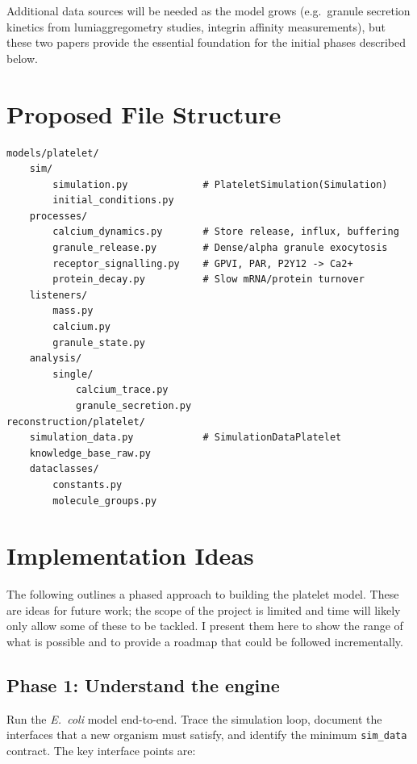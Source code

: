 \documentclass[11pt,a4paper]{article}
\begin{document}
Additional data sources will be needed as the model grows (e.g.\ granule
secretion kinetics from lumiaggregometry studies, integrin affinity
measurements), but these two papers provide the essential foundation for the
initial phases described below.


\section{Proposed File Structure}

\begin{Verbatim}[fontsize=\small]
models/platelet/
    sim/
        simulation.py             # PlateletSimulation(Simulation)
        initial_conditions.py
    processes/
        calcium_dynamics.py       # Store release, influx, buffering
        granule_release.py        # Dense/alpha granule exocytosis
        receptor_signalling.py    # GPVI, PAR, P2Y12 -> Ca2+
        protein_decay.py          # Slow mRNA/protein turnover
    listeners/
        mass.py
        calcium.py
        granule_state.py
    analysis/
        single/
            calcium_trace.py
            granule_secretion.py
reconstruction/platelet/
    simulation_data.py            # SimulationDataPlatelet
    knowledge_base_raw.py
    dataclasses/
        constants.py
        molecule_groups.py
\end{Verbatim}


\section{Implementation Ideas}
\label{sec:plan}

The following outlines a phased approach to building the platelet model.
These are ideas for future work; the scope of the project is limited and
time will likely only allow some of these to be tackled.  I present them
here to show the range of what is possible and to provide a roadmap that
could be followed incrementally.

\subsection{Phase 1: Understand the engine}

Run the \textit{E.~coli} model end-to-end.  Trace the simulation loop,
document the interfaces that a new organism must satisfy, and identify the
minimum \texttt{sim\_data} contract.  The key interface points are:
\end{document}
